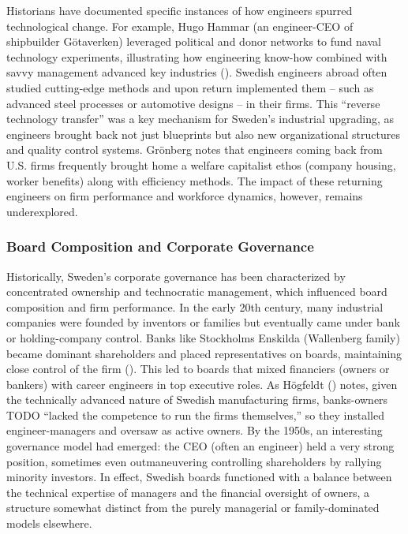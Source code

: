 \documentclass[
]{article}
\begin{document}
Historians have documented specific instances of how engineers spurred
technological change. For example, Hugo Hammar (an engineer-CEO of
shipbuilder Götaverken) leveraged political and donor networks to fund
naval technology experiments, illustrating how engineering know-how
combined with savvy management advanced key industries\hspace{0pt}
().
Swedish engineers abroad often studied cutting-edge methods and upon
return implemented them -- such as advanced steel processes or
automotive designs -- in their firms\hspace{0pt}. This ``reverse
technology transfer'' was a key mechanism for Sweden's industrial
upgrading, as engineers brought back not just blueprints but also new
organizational structures and quality control systems\hspace{0pt}.
Grönberg notes that engineers coming back from U.S. firms frequently
brought home a welfare capitalist ethos (company housing, worker
benefits) along with efficiency methods. The impact of these returning
engineers on firm performance and workforce dynamics, however, remains
underexplored.

\subsubsection{Board Composition and Corporate
Governance}\label{board-composition-and-corporate-governance}

Historically, Sweden's corporate governance has been characterized by
concentrated ownership and technocratic management, which influenced
board composition and firm performance. In the early 20th century, many
industrial companies were founded by inventors or families but
eventually came under bank or holding-company control\hspace{0pt}. Banks
like Stockholms Enskilda (Wallenberg family) became dominant
shareholders and placed representatives on boards, maintaining close
control of the firm
().
This led to boards that mixed financiers (owners or bankers) with career
engineers in top executive roles. As Högfeldt
() notes, given
the technically advanced nature of Swedish manufacturing firms,
banks-owners TODO ``lacked the competence to run the firms themselves,''
so they installed engineer-managers and oversaw as active
owners\hspace{0pt}. By the 1950s, an interesting governance model had
emerged: the CEO (often an engineer) held a very strong position,
sometimes even outmaneuvering controlling shareholders by rallying
minority investors\hspace{0pt}. In effect, Swedish boards functioned
with a balance between the technical expertise of managers and the
financial oversight of owners, a structure somewhat distinct from the
purely managerial or family-dominated models elsewhere.
\end{document}
